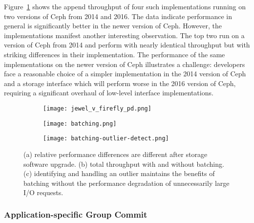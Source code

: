 Figure~\ref{fig:phy-design} shows the append throughput of four such
implementations running on two versions of Ceph from 2014 and 2016. The data indicate 
performance in general is significantly better in the newer version of Ceph. 
However, the implementations manifest another interesting observation. The top two
run on a version of Ceph from 2014 and perform with nearly identical throughput 
but with striking differences in their implementation. The performance of the same
implementations on the newer version of Ceph illustrates a challenge: developers face a
reasonable choice of a simpler implementation in the 2014 version of Ceph and a storage interface
which will perform worse in the 2016 version of Ceph, requiring a significant overhaul of low-level
interface implementations.

\begin{figure*}[t]
    \centering
    \begin{subfigure}[b]{.30\linewidth}
        \centering
        \texttt{[image: jewel\_v\_firefly\_pd.png]}
        \caption{}
        \label{fig:phy-design}
    \end{subfigure}
    \begin{subfigure}[b]{.30\linewidth}
        \centering
        \texttt{[image: batching.png]}
        \caption{}
        \label{fig:batching}
    \end{subfigure}
    \begin{subfigure}[b]{.30\linewidth}
        \centering
        \texttt{[image: batching-outlier-detect.png]}
        \caption{}
        \label{fig:batching-outlier}
    \end{subfigure}
    \caption{(a) relative performance differences are different after storage
    software upgrade. (b) total throughput with and without batching. (c)
    identifying and handling an outlier maintains the benefits
    of batching without the performance degradation of unnecessarily large I/O
    requests.}
\end{figure*}

\subsubsection{Application-specific Group Commit}
\label{sec:batch}

